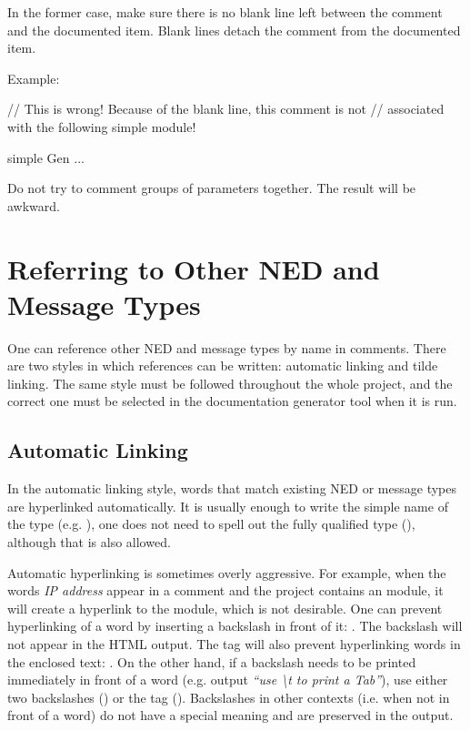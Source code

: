 In the former case, make sure there is no blank line left
between the comment and the documented item. Blank lines
detach the comment from the documented item.

Example:
\begin{ned}
// This is wrong! Because of the blank line, this comment is not
// associated with the following simple module!

simple Gen
{
    ...
}
\end{ned}

Do not try to comment groups of parameters together. The result
will be awkward.

\section{Referring to Other NED and Message Types}
\label{sec:neddoc:referring-to-other-ned-and-message-types}

One can reference other NED and message types by name in comments. There
are two styles in which references can be written: automatic linking and
tilde linking. The same style must be followed throughout the whole
project, and the correct one must be selected in the documentation
generator tool when it is run.

\subsection{Automatic Linking}
\label{sec:neddoc:automatic-linking}

In the automatic linking style, words that match existing NED or message
types are hyperlinked automatically. It is usually enough to write the
simple name of the type (e.g. ), one does not need to spell out the
fully qualified type (), although that is also
allowed.

Automatic hyperlinking is sometimes overly aggressive. For example, when the
words \textit{IP address} appear in a comment and the project contains an
 module, it will create a hyperlink to the module, which is not
desirable. One can prevent hyperlinking of a word by inserting a
backslash in front of it: . The backslash will
not appear in the HTML output. The  tag will also prevent
hyperlinking words in the enclosed text: .
On the other hand, if a backslash needs to be printed immediately
in front of a word (e.g. output \textit{``use {\textbackslash}t to print a Tab''}),
use either two backslashes () or the
 tag ().
Backslashes in other contexts (i.e. when not in front of a word) do not have
a special meaning and are preserved in the output.

